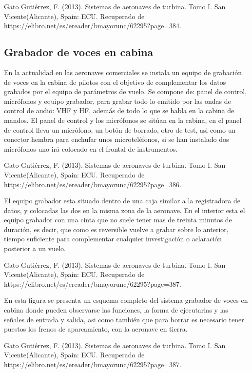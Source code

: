 Gato Gutiérrez, F. (2013). Sistemas de aeronaves de turbina. Tomo I. San Vicente(Alicante), Spain: ECU. Recuperado de https://elibro.net/es/ereader/bmayorunc/62295?page=384.






\subsection{Grabador de voces en cabina}
\label{sec:grabador.voces.en.cabina}

En la actualidad en las aeronaves comerciales se instala un equipo de grabación de voces en la cabina de pilotos con el objetivo de complementar los datos grabados por el equipo de parámetros de vuelo. Se compone de: panel de control, micrófonos y equipo grabador, para grabar todo lo emitido por las ondas de control de audio: VHF y HF, además de todo lo que se habla en la cabina de mandos. El panel de control y los micrófonos se sitúan en la cabina, en el panel de control lleva un micrófono, un botón de borrado, otro de test, asi como un conector hembra para enchufar unos microteléfonos, si se han instalado dos micrófonos uno irá colocado en el frontal de instrumentos.




Gato Gutiérrez, F. (2013). Sistemas de aeronaves de turbina. Tomo I. San Vicente(Alicante), Spain: ECU. Recuperado de https://elibro.net/es/ereader/bmayorunc/62295?page=386.


El equipo grabador esta situado dentro de una caja similar a la registradora de datos, y colocadas las dos en la misma zona de la aeronave. En el interior esta el equipo grabador con una cinta que no suele tener mas de treinta minutos de duración, es decir, que como es reversible vuelve a grabar sobre lo anterior, tiempo suﬁciente para complementar cualquier investigación o aclaración posterior a un vuelo.

Gato Gutiérrez, F. (2013). Sistemas de aeronaves de turbina. Tomo I. San Vicente(Alicante), Spain: ECU. Recuperado de https://elibro.net/es/ereader/bmayorunc/62295?page=387.

En esta ﬁgura se presenta un esquema completo del sistema grabador de voces en cabina donde pueden observarse las funciones, la forma de ejecutarlas y las señales de entrada y salida, asi como también que para borrar es necesario tener puestos los frenos de aparcamiento, con la aeronave en tierra.


Gato Gutiérrez, F. (2013). Sistemas de aeronaves de turbina. Tomo I. San Vicente(Alicante), Spain: ECU. Recuperado de https://elibro.net/es/ereader/bmayorunc/62295?page=387.